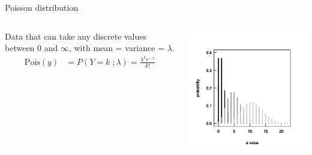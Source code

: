 \documentclass{beamer}
\begin{document}
\begin{frame}{Poisson distribution}
    \begin{columns}
        \begin{column}{0.5\textwidth}
        Data that can take any discrete values between $0$ and $\infty$, with mean = variance = $\lambda$.  
        \begin{align*}
        \text{Pois}(y) &= P(Y = k\; ; \lambda) = \frac{\lambda^k e^{-\lambda}}{k!}
        \end{align*}
        \end{column}
        \begin{column}{0.5\textwidth}
         \includegraphics[width=\textwidth]{lectures/day_10_GLMMs/figures/unnamed-chunk-4-1.png} %
        \end{column}
    \end{columns}
\end{frame}
\end{document}
